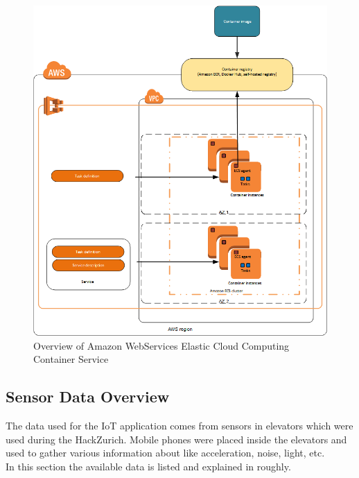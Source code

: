 \begin{figure}[!htbp]
  \centering
  \includegraphics[keepaspectratio=true,scale=0.75]{img/aws_ecs}
    \caption{Overview of Amazon WebServices Elastic Cloud Computing Container Service \cite{aws}}
  \label{fig:aws_ecs}
\end{figure}


\subsection{Sensor Data Overview}
\label{sec:sensor-data}
The data used for the IoT application comes from sensors in elevators which were used during the HackZurich.
Mobile phones were placed inside the elevators and used to gather various information about like acceleration, noise, light, etc.\\
In this section the available data is listed and explained in roughly.

